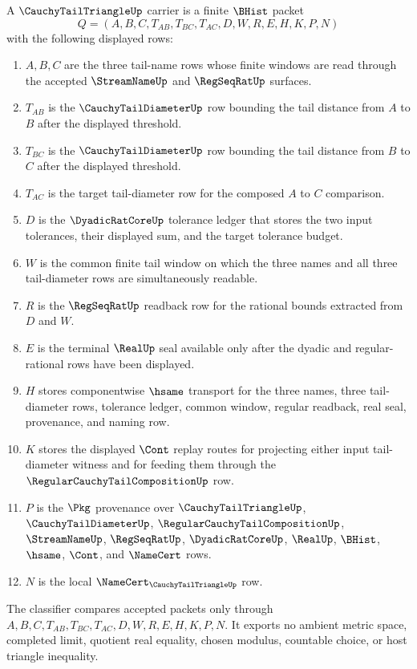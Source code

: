 \begin{definition}
\label{def:cauchy-tail-triangle-carrier}
A $\CauchyTailTriangleUp$ carrier is a finite $\BHist$ packet
$$
Q=(A,B,C,T_{AB},T_{BC},T_{AC},D,W,R,E,H,K,P,N)
$$
with the following displayed rows:
\begin{enumerate}
\item $A,B,C$ are the three tail-name rows whose finite windows are read through the accepted $\StreamNameUp$ and $\RegSeqRatUp$ surfaces.
\item $T_{AB}$ is the $\CauchyTailDiameterUp$ row bounding the tail distance from $A$ to $B$ after the displayed threshold.
\item $T_{BC}$ is the $\CauchyTailDiameterUp$ row bounding the tail distance from $B$ to $C$ after the displayed threshold.
\item $T_{AC}$ is the target tail-diameter row for the composed $A$ to $C$ comparison.
\item $D$ is the $\DyadicRatCoreUp$ tolerance ledger that stores the two input tolerances, their displayed sum, and the target tolerance budget.
\item $W$ is the common finite tail window on which the three names and all three tail-diameter rows are simultaneously readable.
\item $R$ is the $\RegSeqRatUp$ readback row for the rational bounds extracted from $D$ and $W$.
\item $E$ is the terminal $\RealUp$ seal available only after the dyadic and regular-rational rows have been displayed.
\item $H$ stores componentwise $\hsame$ transport for the three names, three tail-diameter rows, tolerance ledger, common window, regular readback, real seal, provenance, and naming row.
\item $K$ stores the displayed $\Cont$ replay routes for projecting either input tail-diameter witness and for feeding them through the $\RegularCauchyTailCompositionUp$ row.
\item $P$ is the $\Pkg$ provenance over $\CauchyTailTriangleUp$, $\CauchyTailDiameterUp$, $\RegularCauchyTailCompositionUp$, $\StreamNameUp$, $\RegSeqRatUp$, $\DyadicRatCoreUp$, $\RealUp$, $\BHist$, $\hsame$, $\Cont$, and $\NameCert$ rows.
\item $N$ is the local $\NameCert_{\CauchyTailTriangleUp}$ row.
\end{enumerate}
The classifier compares accepted packets only through $A,B,C,T_{AB},T_{BC},T_{AC},D,W,R,E,H,K,P,N$. It exports no ambient metric space, completed limit, quotient real equality, chosen modulus, countable choice, or host triangle inequality.
\end{definition}

